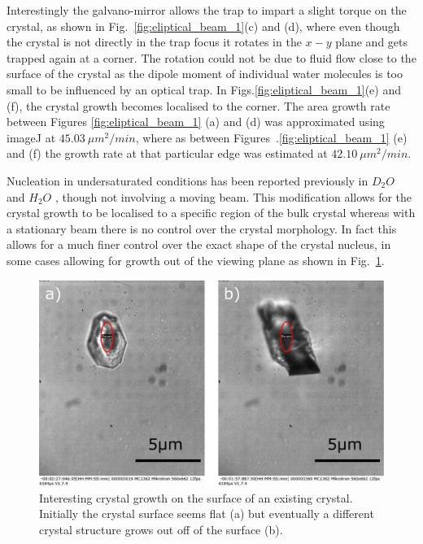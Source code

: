 Interestingly the galvano-mirror allows the trap to 
impart a slight torque on the crystal, as shown in Fig.~\ref{fig:eliptical_beam_1}(c) and (d), where even 
though the crystal is not directly in the trap focus 
it rotates in the $x-y$ plane and gets trapped again 
at a corner. The rotation could not be due to fluid 
flow close to the surface of the crystal as the 
dipole moment of individual water molecules is too 
small to be influenced by an optical trap. In Figs.\ref{fig:eliptical_beam_1}(e) and (f), the 
crystal growth becomes localised to the corner. The 
area growth rate between Figures \ref{fig:eliptical_beam_1}
(a) and (d) was approximated using imageJ at $45.03\ 
\mu m^2 /min$, where as between Figures~.\ref{fig:eliptical_beam_1}
(e) and (f) the growth rate at that particular edge was estimated 
at $42.10\ \mu m^2/min$. 
 
Nucleation in undersaturated conditions has been 
reported previously in $D_2O$ \cite{Rungsimanon2010} 
and $H_2O$ \cite{Flannigan2023}, though not involving 
a moving beam. This modification allows for the crystal 
growth to be localised to a specific region of the bulk 
crystal whereas with a stationary beam there is no 
control over the crystal morphology. In fact this allows 
for a much finer control over the exact shape of the 
crystal nucleus, in some cases allowing for growth out
of the viewing plane as shown in Fig.~\ref{fig:out_of_plane}.
\begin{figure}[h!]
	\centering
	\includegraphics[width=\linewidth]{out_of_plane.pdf}
	\caption{Interesting crystal growth on the surface of an
	existing crystal. Initially the crystal surface seems 
	flat (a) but eventually a different crystal structure 
	grows out off of the surface (b).}
	\label{fig:out_of_plane}
\end{figure}

